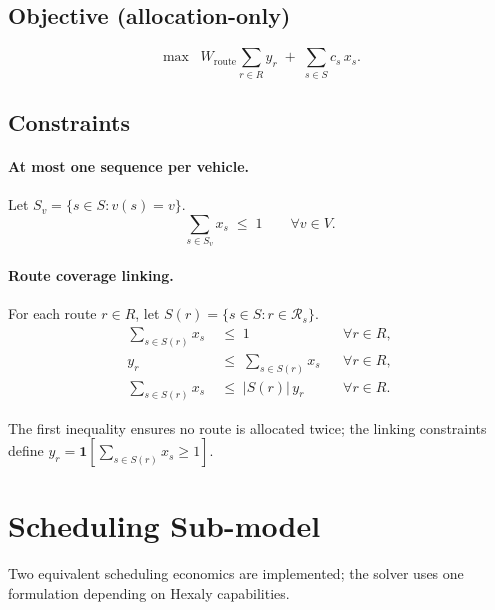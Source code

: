 \documentclass[11pt,a4paper]{article}
\newcommand{\1}{\mathbf{1}}
\begin{document}
\subsection{Objective (allocation-only)}

\begin{equation}
  \label{eq:alloc-obj}
  \max \;\; W_{\mathrm{route}} \sum_{r \in R} y_r \;+\; \sum_{s \in S} c_s\, x_s.
\end{equation}

\subsection{Constraints}

\paragraph{At most one sequence per vehicle.}
Let $S_v = \{s \in S : v(s) = v\}$.
\begin{equation}
  \sum_{s \in S_v} x_s \;\le\; 1 \qquad \forall v \in V.
\end{equation}

\paragraph{Route coverage linking.}
For each route $r \in R$, let $S(r) = \{s \in S : r \in \mathcal{R}_s\}$.
\begin{align}
  \sum_{s \in S(r)} x_s &\;\le\; 1 && \forall r \in R, \\
  y_r &\;\le\; \sum_{s \in S(r)} x_s && \forall r \in R, \\
  \sum_{s \in S(r)} x_s &\;\le\; |S(r)|\, y_r && \forall r \in R.
\end{align}

The first inequality ensures no route is allocated twice; the linking constraints
define $y_r = \1[\sum_{s \in S(r)} x_s \ge 1]$.

\section{Scheduling Sub-model}

Two equivalent scheduling economics are implemented; the solver uses one formulation
depending on Hexaly capabilities.

\end{document}

